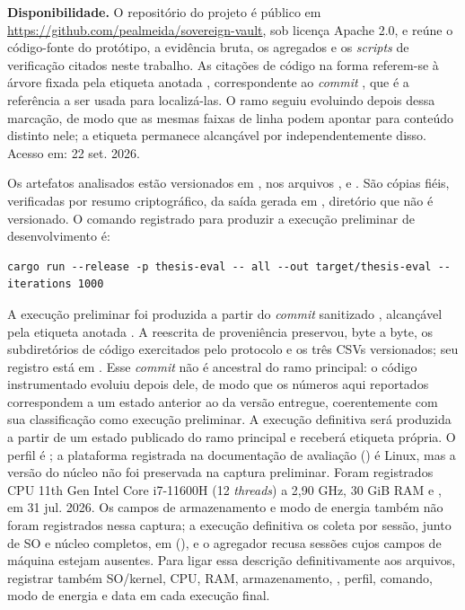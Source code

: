 \begin{apendicesenv}
{\sloppy \textbf{Disponibilidade.} O repositório do projeto é público em \url{https://github.com/pealmeida/sovereign-vault}, sob licença Apache 2.0, e reúne o código-fonte do protótipo, a evidência bruta, os agregados e os \textit{scripts} de verificação citados neste trabalho. As citações de código na forma  referem-se à árvore fixada pela etiqueta anotada , correspondente ao \textit{commit} , que é a referência a ser usada para localizá-las. O ramo  seguiu evoluindo depois dessa marcação, de modo que as mesmas faixas de linha podem apontar para conteúdo distinto nele; a etiqueta permanece alcançável por  independentemente disso. Acesso em: 22 set. 2026.\par}
Os artefatos analisados estão versionados em , nos arquivos ,  e . São cópias fiéis, verificadas por resumo criptográfico, da saída gerada em , diretório que não é versionado. O comando registrado para produzir a execução preliminar de desenvolvimento é:
\begingroup
\footnotesize
\begin{verbatim}
cargo run --release -p thesis-eval -- all --out target/thesis-eval --iterations 1000
\end{verbatim}
\endgroup
A execução preliminar foi produzida a partir do \textit{commit} sanitizado , alcançável pela etiqueta anotada . A reescrita de proveniência preservou, byte a byte, os subdiretórios de código exercitados pelo protocolo e os três CSVs versionados; seu registro está em . Esse \textit{commit} não é ancestral do ramo principal: o código instrumentado evoluiu depois dele, de modo que os números aqui reportados correspondem a um estado anterior ao da versão entregue, coerentemente com sua classificação como execução preliminar. A execução definitiva será produzida a partir de um estado publicado do ramo principal e receberá etiqueta própria. O perfil é ; a plataforma registrada na documentação de avaliação () é Linux, mas a versão do núcleo não foi preservada na captura preliminar. Foram registrados CPU 11th Gen Intel Core i7-11600H (12 \textit{threads}) a 2,90 GHz, 30 GiB RAM e , em 31 jul. 2026. Os campos de armazenamento e modo de energia também não foram registrados nessa captura; a execução definitiva os coleta por sessão, junto de SO e núcleo completos, em  (), e o agregador recusa sessões cujos campos de máquina estejam ausentes. Para ligar essa descrição definitivamente aos arquivos, registrar também SO/kernel, CPU, RAM, armazenamento, , perfil, comando, modo de energia e data em cada execução final.


\end{apendicesenv}
